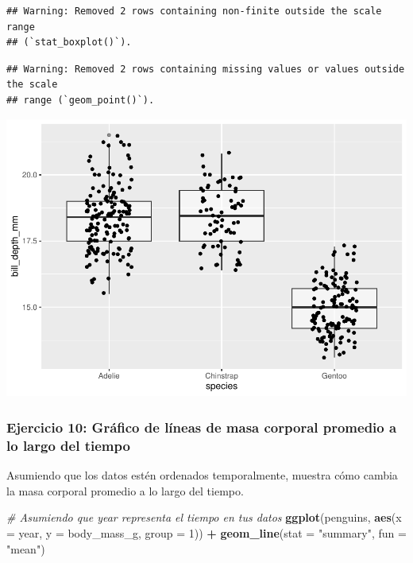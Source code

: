\documentclass[
]{book}
\newenvironment{Shaded}{\begin{snugshade}}{\end{snugshade}}
\newcommand{\AttributeTok}[1]{\textcolor[rgb]{0.13,0.29,0.53}{#1}}
\newcommand{\CommentTok}[1]{\textcolor[rgb]{0.56,0.35,0.01}{\textit{#1}}}
\newcommand{\DecValTok}[1]{\textcolor[rgb]{0.00,0.00,0.81}{#1}}
\newcommand{\FunctionTok}[1]{\textcolor[rgb]{0.13,0.29,0.53}{\textbf{#1}}}
\newcommand{\NormalTok}[1]{#1}
\newcommand{\SpecialCharTok}[1]{\textcolor[rgb]{0.81,0.36,0.00}{\textbf{#1}}}
\newcommand{\StringTok}[1]{\textcolor[rgb]{0.31,0.60,0.02}{#1}}
\begin{document}
\begin{verbatim}
## Warning: Removed 2 rows containing non-finite outside the scale range
## (`stat_boxplot()`).
\end{verbatim}

\begin{verbatim}
## Warning: Removed 2 rows containing missing values or values outside the scale
## range (`geom_point()`).
\end{verbatim}

\includegraphics{bookdown-demo_files/figure-latex/unnamed-chunk-189-1.pdf}

\subsubsection{Ejercicio 10: Gráfico de líneas de masa corporal promedio a lo largo del tiempo}\label{ejercicio-10-gruxe1fico-de-luxedneas-de-masa-corporal-promedio-a-lo-largo-del-tiempo}

Asumiendo que los datos estén ordenados temporalmente, muestra cómo cambia la masa corporal promedio a lo largo del tiempo.

\begin{Shaded}
\begin{Highlighting}[]
\CommentTok{\# Asumiendo que \textquotesingle{}year\textquotesingle{} representa el tiempo en tus datos}
\FunctionTok{ggplot}\NormalTok{(penguins, }\FunctionTok{aes}\NormalTok{(}\AttributeTok{x =}\NormalTok{ year, }\AttributeTok{y =}\NormalTok{ body\_mass\_g, }\AttributeTok{group =} \DecValTok{1}\NormalTok{)) }\SpecialCharTok{+}
  \FunctionTok{geom\_line}\NormalTok{(}\AttributeTok{stat =} \StringTok{"summary"}\NormalTok{, }\AttributeTok{fun =} \StringTok{"mean"}\NormalTok{)}
\end{Highlighting}
\end{Shaded}
\end{document}
